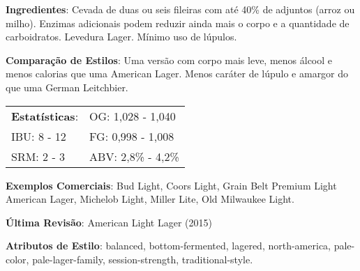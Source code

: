 \textbf{Ingredientes}: Cevada de duas ou seis fileiras com até 40\% de adjuntos (arroz ou milho). Enzimas adicionais podem reduzir ainda mais o corpo e a quantidade de carboidratos. Levedura Lager. Mínimo uso de lúpulos.

\textbf{Comparação de Estilos}: Uma versão com corpo mais leve, menos álcool e menos calorias que uma American Lager. Menos caráter de lúpulo e amargor do que uma German Leitchbier.

\begin{tabular}{@{}p{35mm}p{35mm}@{}}
  \textbf{Estatísticas}: & OG: 1,028 - 1,040 \\
  IBU: 8 - 12  & FG: 0,998 - 1,008 \\
  SRM: 2 - 3  & ABV: 2,8\% - 4,2\%
\end{tabular}

\textbf{Exemplos Comerciais}: Bud Light, Coors Light, Grain Belt Premium Light American Lager, Michelob Light, Miller Lite, Old Milwaukee Light.

\textbf{Última Revisão}: American Light Lager (2015)

\textbf{Atributos de Estilo}: balanced, bottom-fermented, lagered, north-america, pale-color, pale-lager-family, session-strength, traditional-style.